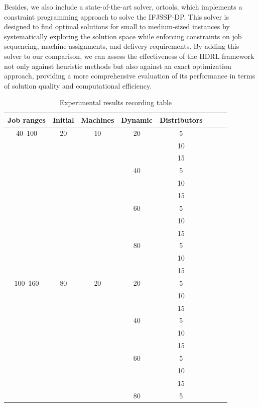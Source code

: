 \documentclass{article}
\begin{document}
Besides, we also include a state-of-the-art solver, ortools, which implements a constraint programming approach to solve the IFJSSP-DP. This solver is designed to find optimal solutions for small to medium-sized instances by systematically exploring the solution space while enforcing constraints on job sequencing, machine assignments, and delivery requirements. By adding this solver to our comparison, we can assess the effectiveness of the HDRL framework not only against heuristic methods but also against an exact optimization approach, providing a more comprehensive evaluation of its performance in terms of solution quality and computational efficiency.

\begin{table}[htbp]
\centering
\caption{Experimental results recording table}
\label{tab:exp_results_with_heuristics}
\begin{tabular}{cccccccc}
\hline
\textbf{Job ranges} & \textbf{Initial}& \textbf{Machines} & \textbf{Dynamic}  & \textbf{Distributors}  \\ \hline
40--100 & 20& 10 & 20  & 5    \\
        &    & &   & 10   \\
        &   &  &   & 15   \\
        &    & & 40  & 5   \\
        &   &  &   & 10   \\
        &   &  &   & 15  \\
        &   &  & 60  & 5    \\
        &   &  &     & 10   \\
        &   &  &     & 15   \\
        &   &  & 80  & 5    \\ 
        &   &  &   & 10    \\ 
        &   &  &   & 15    \\ \hline
        100--160 & 80& 20 & 20  & 5    \\
        &    & &   & 10   \\
        &   &  &   & 15   \\
        &    & & 40  & 5   \\
        &   &  &   & 10   \\
        &   &  &   & 15  \\
        &   &  & 60  & 5    \\
        &   &  &     & 10   \\
        &   &  &     & 15   \\
        &   &  & 80  & 5    \\ 

\end{tabular}
\end{table}
\end{document}
